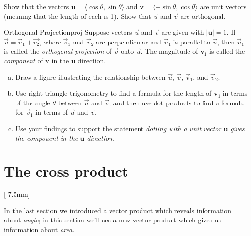 \documentclass{watsonbook}
\begin{document}
\begin{exercise}{}{}
  Show that the vectors
  $\mathbf{u} = \langle \cos \theta, \sin \theta \rangle$ and
  $\mathbf{v} = \langle -\sin \theta, \cos \theta \rangle$ are unit
  vectors (meaning that the length of each is 1). Show that $\vec{u}$
  and $\vec{v}$ are orthogonal.
\end{exercise}

\begin{exercise}{Orthogonal Projection}{proj}
  Suppose vectors $\vec{u}$ and $\vec{v}$ are given with
  $|\mathbf{u}| = 1$. If $\vec{v} = \vec{v}_1 + \vec{v_2}$, where
  $\vec{v}_1$ and $\vec{v}_2$ are perpendicular and $\vec{v}_1$ is
  parallel to $\vec{u}$, then $\vec{v}_1$ is called the
  \textit{orthogonal projection} of $\vec{v}$ onto $\vec{u}$. The
  magnitude of $\mathbf{v}_1$ is called the \textit{component} of
  $\mathbf{v}$ in the $\mathbf{u}$ direction.

  \begin{enumerate}[(a)]
  \item Draw a figure illustrating the relationship between $\vec{u}$,
    $\vec{v}$, $\vec{v}_1$, and $\vec{v}_2$. 

  \item Use right-triangle trigonometry to find a formula for the
    length of $\mathbf{v}_1$ in terms of the angle $\theta$ between
    $\vec{u}$ and $\vec{v}$, and then use dot products to find a
    formula for $\vec{v}_1$ in terms of $\vec{u}$ and $\vec{v}$.

  \item Use your findings to support the statement \textit{dotting
      with a unit vector $\mathbf{u}$ gives the component in the
      $\mathbf{u}$ direction}. 
  \end{enumerate}
\end{exercise}

\section{The cross product} \label{sec:cross} 

[-7.5mm]

In the last section we introduced a vector product which reveals
information about \textit{angle}; in this section we'll see a new
vector product which gives us information about \textit{area}.
\end{document}
